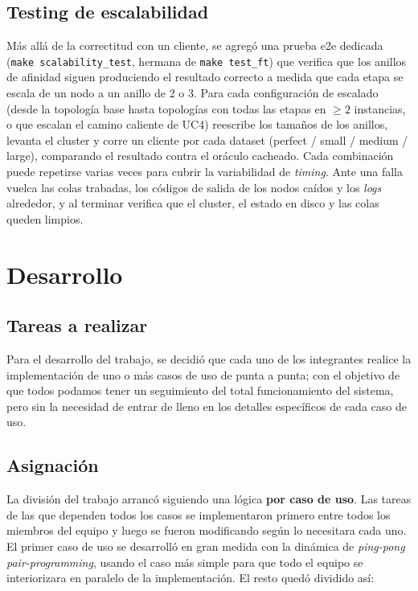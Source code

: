 \documentclass[12pt,a4paper]{article}
\begin{document}
\subsection{Testing de escalabilidad}
Más allá de la correctitud con un cliente, se agregó una prueba e2e dedicada
(\texttt{make scalability\_test}, hermana de \texttt{make test\_ft})
que verifica que
los anillos de afinidad siguen produciendo el resultado correcto a
medida que cada etapa
se escala de un nodo a un anillo de 2 o 3. Para cada configuración de escalado
(desde la topología base hasta topologías con todas las etapas en
    $\geq 2$ instancias,
o que escalan el camino caliente de UC4) reescribe los tamaños de los anillos,
levanta el cluster y corre un cliente por cada dataset (perfect /
    small / medium /
large), comparando el resultado contra el oráculo cacheado. Cada
combinación puede
repetirse varias veces para cubrir la variabilidad de \textit{timing}.
Ante una falla vuelca las colas trabadas, los códigos de salida de
los nodos caídos y
los \textit{logs} alrededor, y al terminar verifica que el cluster,
el estado en disco
y las colas queden limpios.

\newpage
\section{Desarrollo}
\subsection{Tareas a realizar}
Para el desarrollo del trabajo, se decidió que cada uno de los
integrantes realice la implementación de uno o más casos de uso de
punta a punta; con el objetivo de que todos podamos tener un
seguimiento del total funcionamiento del sistema, pero sin la
necesidad de entrar de lleno en los detalles específicos de cada caso de uso.

\subsection{Asignación}
La división del trabajo arrancó siguiendo una lógica \textbf{por caso de
uso}. Las tareas de las que dependen todos los casos se implementaron
primero entre todos los miembros del equipo y luego se fueron modificando
según lo necesitara cada uno. El primer caso de uso se desarrolló en gran
medida con la dinámica de \textit{ping-pong pair-programming}, usando el caso
más simple para que todo el equipo se interiorizara en paralelo de la
implementación. El resto quedó dividido así:
\end{document}
